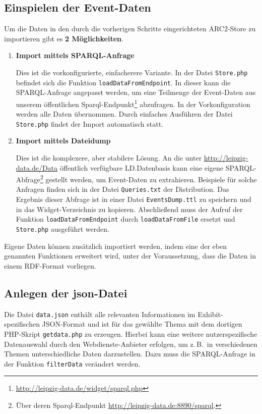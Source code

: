 \documentclass[11pt,a4paper]{article}
\begin{document}
\subsection{Einspielen der Event-Daten}
Um die Daten in den durch die vorherigen Schritte eingerichteten ARC2-Store zu
importieren gibt es \textbf{2 Möglichkeiten}.
\begin{enumerate}
\item \textbf{Import mittels SPARQL-Anfrage}

  Dies ist die vorkonfigurierte, einfacherere Variante. In der Datei
  \texttt{Store.php} befindet sich die Funktion \texttt{loadDataFromEndpoint}.
  In dieser kann die SPARQL-Anfrage angepasst werden, um eine Teilmenge der
  Event-Daten aus unserem öffentlichen
  Sparql-Endpunkt\footnote{\url{http://leipzig-data.de/widget/sparql.php}}
  abzufragen. In der Vorkonfiguration werden alle Daten übernommen. Durch
  einfaches Ausführen der Datei \texttt{Store.php} findet der Import
  automatisch statt.

\item \textbf{Import mittels Dateidump}

Dies ist die komplexere, aber stabilere Lösung.  An die unter
\url{http://leipzig-data.de/Data} öffentlich verfügbare LD.Datenbasis kann
eine eigene SPARQL-Abfrage\footnote{Über deren Sparql-Endpunkt
  \url{http://leipzig-data.de:8890/sparql}.} gestellt werden, um Event-Daten
zu extrahieren.  Beispiele für solche Anfragen finden sich in der Datei
\texttt{Queries.txt} der Distribution.  Das Ergebnis dieser Abfrage ist in
einer Datei \texttt{EventsDump.ttl} zu speichern und in das Widget-Verzeichnis
zu kopieren. Abschließend muss der Aufruf der Funktion
\texttt{loadDataFromEndpoint} durch \texttt{loadDataFromFile} ersetzt und
\texttt{Store.php} ausgeführt werden.
\end{enumerate}
Eigene Daten können zusätzlich importiert werden, indem eine der eben
genannten Funktionen erweitert wird, unter der Voraussetzung, dass die Daten
in einem RDF-Format vorliegen.

\subsection{Anlegen der json-Datei}

Die Datei \texttt{data.json} enthält alle relevanten Informationen im
Exhibit-spezifischen JSON-Format und ist für das gewählte Thema mit dem
dortigen PHP-Skript \texttt{getdata.php} zu erzeugen.  Hierbei kann eine
weitere nutzerspezifische Datenauswahl durch den Webdienste-Anbieter erfolgen,
um z.\,B.\ in verschiedenen Themen unterschiedliche Daten darzustellen. Dazu
muss die SPARQL-Anfrage in der Funktion \texttt{filterData} verändert werden.
\end{document}
